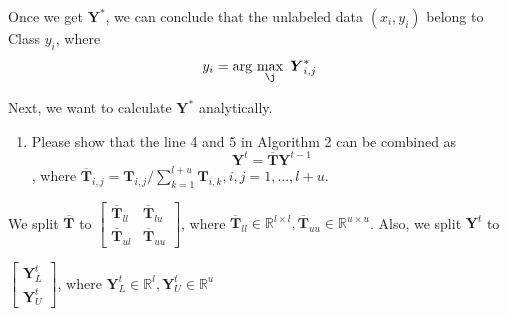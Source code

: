 \documentclass{article}
\begin{document}
\newpage
Once we get $\boldsymbol{Y}^{*}$, we can conclude that the unlabeled data $(x_i,y_i)$ belong to Class $y_i$, where
$$y_i= \text{arg}\,\max\limits_{\j}\ \boldsymbol{Y}^{*}_{i,j}$$

Next, we want to calculate $\boldsymbol{Y}^{*}$ analytically.

\begin{enumerate}[resume]
\item Please show that the line 4 and 5 in Algorithm 2 can be combined as
$$\boldsymbol{Y}^{t} = \boldsymbol{\overline{T}} \boldsymbol{Y}^{t-1}$$, where
$\boldsymbol{\overline{T}}_{i,j}=\boldsymbol{T}_{i,j}/\sum_{k=1}^{l+u} \boldsymbol{T}_{i,k}, i,j=1,...,l+u$.
\end{enumerate}
We split $\boldsymbol{\overline{T}}$ to 
$\begin{bmatrix}
\boldsymbol{\overline{T}}_{ll} & \boldsymbol{\overline{T}}_{lu}\\
\boldsymbol{\overline{T}}_{ul} & \boldsymbol{\overline{T}}_{uu}
\end{bmatrix}$, where $\boldsymbol{\overline{T}}_{ll} \in \mathbb{R}^{l \times l}, \boldsymbol{\overline{T}}_{uu} \in \mathbb{R}^{u \times u}$. Also, we split $\boldsymbol{Y}^{t}$ to

$\begin{bmatrix}
\boldsymbol{Y}^{t}_L \\
\boldsymbol{Y}^{t}_U
\end{bmatrix}$, where $\boldsymbol{Y}^{t}_L \in \mathbb{R}^{l}, \boldsymbol{Y}^{t}_U \in \mathbb{R}^{u}$
\end{document}
